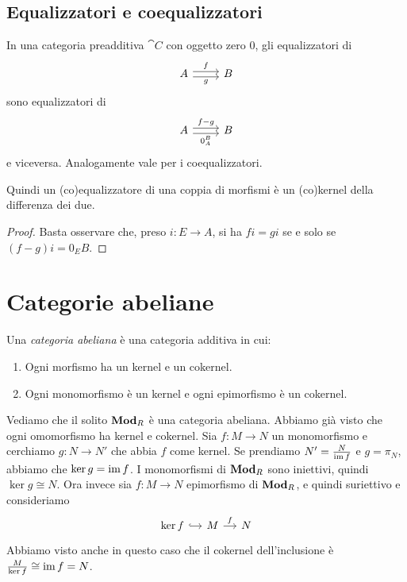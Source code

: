 \subsection{Equalizzatori e coequalizzatori}


\begin{proposition}\label{proposition:EqualizersAreKernels}
  In una categoria preadditiva \(\cat C\) con oggetto zero \(0\), gli
  equalizzatori di
  \[
    \begin{tikzcd}
      A \ar["f", r, shift left] \ar["g", r, shift right, swap] & B
    \end{tikzcd}
  \]
  sono equalizzatori di
  \[
    \begin{tikzcd}
      A \ar["{f-g}", r, shift left] \ar["{0_A^B}", r, shift right, swap]
      & B
    \end{tikzcd}
  \]
  e viceversa. Analogamente vale per i coequalizzatori.
\end{proposition}

Quindi un (co)equalizzatore di una coppia di morfismi è un (co)kernel
della differenza dei due.

\begin{proof}
  Basta osservare che, preso \(i : E \to A\), si ha \(fi = gi\) se e solo se \((f-g)i = 0_EB\).
\end{proof}



\section{Categorie abeliane}

\begin{definition}\label{definition:AbelianCategories}
  Una {\em categoria abeliana} è una categoria additiva in cui:
  \begin{enumerate}[leftmargin=*]
  \item Ogni morfismo ha un kernel e un cokernel.
  \item Ogni monomorfismo è un kernel e ogni epimorfismo è un cokernel.
  \end{enumerate}
\end{definition}

\begin{example}
  Vediamo che il solito \(\mathbf{Mod}_R\) è una categoria abeliana. Abbiamo
  già visto che ogni omomorfismo ha kernel e cokernel. Sia
  \(f : M \to N\) un monomorfismo e cerchiamo \(g : N \to N'\) che abbia
  \(f\) come kernel. Se prendiamo \(N' = \frac{N}{\operatorname{im} f}\) e
  \(g = \pi_N\), abbiamo che \(\ker g = \operatorname{im} f\). I monomorfismi di
  \(\mathbf{Mod}_R\) sono iniettivi, quindi \(\ker g \cong N\). Ora invece sia
  \(f : M \to N\) epimorfismo di \(\mathbf{Mod}_R\), e quindi suriettivo e
  consideriamo
  \[
    \begin{tikzcd}[column sep=small]
      \ker f \ar["{}", r, hookrightarrow] & M \ar["{f}", r] & N
    \end{tikzcd}
  \]
  Abbiamo visto anche in questo caso che il cokernel dell'inclusione è
  \(\frac{M}{\ker f} \cong \operatorname{im} f = N\).
\end{example}

